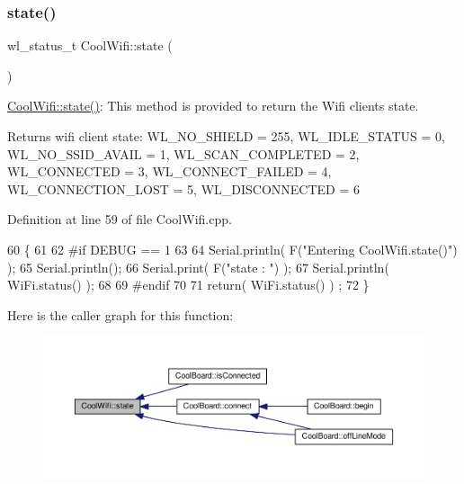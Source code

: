 \subsubsection{\texorpdfstring{state()}{state()}}
{\footnotesize\ttfamily wl\+\_\+status\+\_\+t Cool\+Wifi\+::state (\begin{DoxyParamCaption}{ }\end{DoxyParamCaption})}

\hyperlink{class_cool_wifi_a1c7b4d82a4098d346e7593dce92039fa}{Cool\+Wifi\+::state()}\+: This method is provided to return the Wifi client\textquotesingle{}s state. \begin{DoxyReturn}{Returns}
wifi client state\+: W\+L\+\_\+\+N\+O\+\_\+\+S\+H\+I\+E\+LD = 255, W\+L\+\_\+\+I\+D\+L\+E\+\_\+\+S\+T\+A\+T\+US = 0, W\+L\+\_\+\+N\+O\+\_\+\+S\+S\+I\+D\+\_\+\+A\+V\+A\+IL = 1, W\+L\+\_\+\+S\+C\+A\+N\+\_\+\+C\+O\+M\+P\+L\+E\+T\+ED = 2, W\+L\+\_\+\+C\+O\+N\+N\+E\+C\+T\+ED = 3, W\+L\+\_\+\+C\+O\+N\+N\+E\+C\+T\+\_\+\+F\+A\+I\+L\+ED = 4, W\+L\+\_\+\+C\+O\+N\+N\+E\+C\+T\+I\+O\+N\+\_\+\+L\+O\+ST = 5, W\+L\+\_\+\+D\+I\+S\+C\+O\+N\+N\+E\+C\+T\+ED = 6 
\end{DoxyReturn}


Definition at line 59 of file Cool\+Wifi.\+cpp.


\begin{DoxyCode}
60 \{
61 
62 \textcolor{preprocessor}{#if DEBUG == 1 }
63 
64     Serial.println( F(\textcolor{stringliteral}{"Entering CoolWifi.state()"}) );
65     Serial.println();   
66     Serial.print( F(\textcolor{stringliteral}{"state : "}) );
67     Serial.println( WiFi.status() );
68 
69 \textcolor{preprocessor}{#endif}
70     
71     \textcolor{keywordflow}{return}( WiFi.status() ) ;
72 \}
\end{DoxyCode}
Here is the caller graph for this function\+:\nopagebreak
\begin{figure}[H]
\begin{center}
\leavevmode
\includegraphics[width=350pt]{d7/d29/class_cool_wifi_a1c7b4d82a4098d346e7593dce92039fa_icgraph}
\end{center}
\end{figure}



